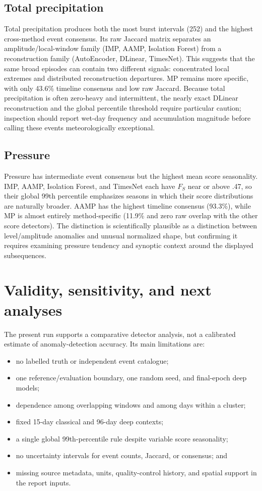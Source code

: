 \documentclass[11pt,a4paper]{article}
\begin{document}
\subsection{Total precipitation}
Total precipitation produces both the most burst intervals (252) and the highest
cross-method event consensus. Its raw Jaccard matrix separates an
amplitude/local-window family (IMP, AAMP, Isolation Forest) from a reconstruction
family (AutoEncoder, DLinear, TimesNet). This suggests that the same broad
episodes can contain two different signals: concentrated local extremes and
distributed reconstruction departures. MP remains more specific, with only
43.6\% timeline consensus and low raw Jaccard. Because total precipitation is often
zero-heavy and intermittent, the nearly exact DLinear reconstruction and the
global percentile threshold require particular caution; inspection should
report wet-day frequency and accumulation magnitude before calling these
events meteorologically exceptional.

\subsection{Pressure}
Pressure has intermediate event consensus but the highest mean score
seasonality. IMP, AAMP, Isolation Forest, and TimesNet each have $F_S$ near or
above .47, so their global 99th percentile emphasizes seasons in which their
score distributions are naturally broader. AAMP has the highest timeline
consensus (93.3\%), while MP is almost entirely method-specific (11.9\% and
zero raw overlap with the other score detectors). The distinction is
scientifically plausible as a distinction between level/amplitude anomalies
and unusual normalized shape, but confirming it requires examining pressure
tendency and synoptic context around the displayed subsequences.

\section{Validity, sensitivity, and next analyses}
The present run supports a comparative detector analysis, not a calibrated
estimate of anomaly-detection accuracy. Its main limitations are:
\begin{itemize}
\item no labelled truth or independent event catalogue;
\item one reference/evaluation boundary, one random seed, and final-epoch deep models;
\item dependence among overlapping windows and among days within a cluster;
\item fixed 15-day classical and 96-day deep contexts;
\item a single global 99th-percentile rule despite variable score seasonality;
\item no uncertainty intervals for event counts, Jaccard, or consensus; and
\item missing source metadata, units, quality-control history, and spatial
support in the report inputs.
\end{itemize}
\end{document}
